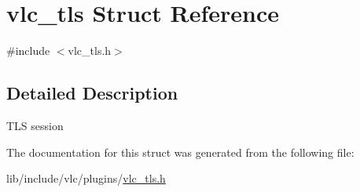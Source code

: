 \hypertarget{structvlc__tls}{}\section{vlc\+\_\+tls Struct Reference}
\label{structvlc__tls}


{\ttfamily \#include $<$vlc\+\_\+tls.\+h$>$}



\subsection{Detailed Description}
T\+LS session 

The documentation for this struct was generated from the following file\+:\begin{DoxyCompactItemize}
\item 
lib/include/vlc/plugins/\hyperlink{vlc__tls_8h}{vlc\+\_\+tls.\+h}\end{DoxyCompactItemize}
